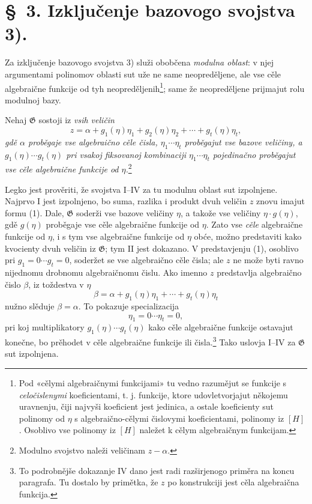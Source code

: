 \documentclass[11pt]{article}
\begin{document}
\section*{\S\ 3. Izključenje bazovogo svojstva 3).}

Za izključenje bazovogo svojstva 3) služi obobčena
{\itshape modulna oblast}: v njej argumentami polinomov oblasti sut uže ne same
neopreděljene, ale vse cěle algebraične funkcije od tyh
neopreděljenih\footnote{Pod «cělymi algebraičnymi funkcijami» tu vedno
razumějut se funkcije s {\itshape celočislenymi} koeficientami, t. j. funkcije,
ktore udovletvorjajut někojemu uravnenju, čiji najvyši koeficient jest
jedinica, a ostale koeficienty sut polinomy od $\eta$ s algebraično-cělymi
čislovymi koeficientami, polinomy iz $[H]$. Osoblivo vse polinomy iz $[H]$
naležet k cělym algebraičnym funkcijam.}; same že neopreděljene prijmajut rolu
modulnoj bazy.

Nehaj $\mathfrak G$ sostoji iz {\itshape vsih veličin}
\begin{equation}
 z=\alpha+g_1(\eta)\eta_1+g_2(\eta)\eta_2+\cdots+g_t(\eta)\eta_t,
\tag{1}
\end{equation}
{\itshape gdě $\alpha$ proběgaje vse algebraično cěle čisla,
$\eta_1\cdots\eta_t$ proběgajut vse bazove veličiny, a
$g_1(\eta)\cdots g_t(\eta)$ pri vsakoj fiksovanoj kombinaciji
$\eta_1\cdots\eta_t$ pojedinačno proběgajut vse cěle algebraične funkcije od
$\eta$.}\footnote{Modulno svojstvo naleži veličinam $z-\alpha$.}

Legko jest prověriti, že svojstva I--IV za tu modulnu oblast sut izpolnjene.
Najprvo I jest izpolnjeno, bo suma, razlika i produkt dvuh veličin $z$ znovu
imajut formu (1). Dale, $\mathfrak G$ soderži vse bazove veličiny $\eta$, a
takože vse veličiny $\eta\cdot g(\eta)$, gdě $g(\eta)$ proběgaje vse cěle
algebraične funkcije od $\eta$. Zato vse {\itshape cěle} algebraične funkcije
od $\eta$, i s tym vse algebraične funkcije od $\eta$ obće, možno predstaviti
kako kvocienty dvuh veličin iz $\mathfrak G$; tym II jest dokazano. V
predstavjenju (1), osoblivo pri $g_1=0\cdots g_t=0$, soderžet se vse
algebraično cěle čisla; ale $z$ ne može byti ravno nijednomu drobnomu
algebraičnomu čislu. Ako imenno $z$ predstavlja algebraično čislo $\beta$, iz
toždestva v $\eta$
\[
 \beta=\alpha+g_1(\eta)\eta_1+\cdots+g_t(\eta)\eta_t
\]
nužno slěduje $\beta=\alpha$. To pokazuje specializacija
\[
 \eta_1=0\cdots \eta_t=0,
\]
pri koj multiplikatory $g_1(\eta)\cdots g_t(\eta)$ kako cěle algebraične
funkcije ostavajut konečne, bo prěhodet v cěle algebraične funkcije ili
čisla.\footnote{To podrobnějše dokazanje IV dano jest radi razširjenogo priměra
na koncu paragrafa. Tu dostalo by primětka, že $z$ po konstrukciji jest cěla
algebraična funkcija.} Tako uslovja I--IV za $\mathfrak G$ sut izpolnjena.
\end{document}

